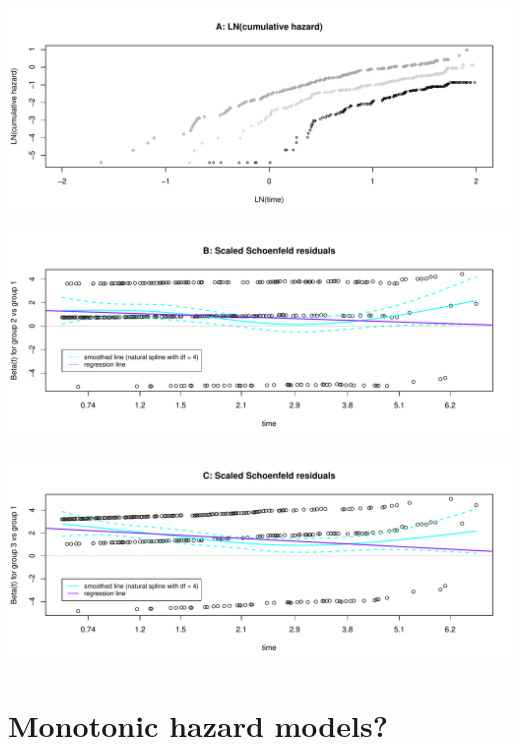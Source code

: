 \documentclass[]{article}
\begin{document}
\begin{flushleft}\includegraphics[height=0.29\textheight]{images/PH_assumption-1} \end{flushleft}

\begin{flushleft}\includegraphics[height=0.29\textheight]{images/PH_assumption-2} \end{flushleft}

\begin{flushleft}\includegraphics[height=0.29\textheight]{images/PH_assumption-3} \end{flushleft}

\newpage

\section{Monotonic hazard models?}\label{monotonic-hazard-models}
\end{document}
